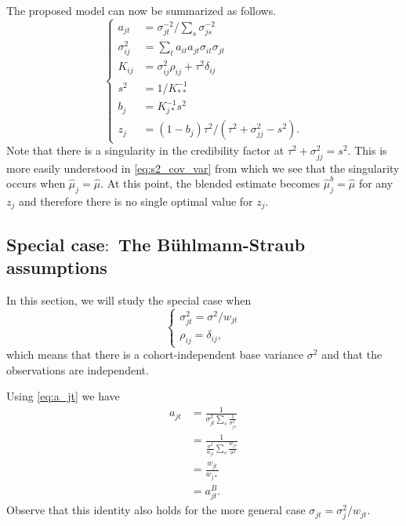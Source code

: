 \documentclass[11pt]{article}
\theoremstyle{definition}
\begin{document}
The proposed model can now be summarized as follows.
\begin{equation}\label{eq:proposed}
    \begin{cases}
    a_{jt} &= \sigma_{jt}^{-2}/\sum_s \sigma_{js}^{-2} \\
    \sigma_{ij}^2 &= \sum_t a_{it}a_{jt}\sigma_{it}\sigma_{jt} \\
     K_{ij} &= \sigma_{ij}^2\rho_{ij} + \tau^2\delta_{ij} \\
    s^2 &= 1/ K ^{-1}_{\ast\ast} \\
    b_j &=  K_{j\ast}^{-1}s^2 \\
    z_j &= (1-b_j)\tau^2/(\tau^2 + \sigma_{jj}^2 - s^2).
    \end{cases}
\end{equation}
Note that there is a singularity in the credibility factor at $\tau^2+\sigma_{jj}^2=s^2$. This is more easily understood in \eqref{eq:s2_cov_var} from which we see that the singularity occurs when $\hat\mu_j=\hat\mu$. At this point, the blended estimate becomes $\hat\mu_j^b=\hat\mu$ for any $z_j$ and therefore there is no single optimal value for $z_j$. 

\subsection{Special case$\colon$ The Bühlmann-Straub assumptions}
In this section, we will study the special case when
\begin{equation}\label{eq:special_case_1}
\begin{cases}
    \sigma_{jt}^2 = \sigma^2/w_{jt} \\
    \rho_{ij} = \delta_{ij},
\end{cases}
\end{equation}
which means that there is a cohort-independent base variance $\sigma^2$ and that the observations are independent.

Using \eqref{eq:a_jt} we have
\begin{equation}\label{eq:special_case_ajt}
\begin{aligned}
    a_{jt} &= \frac{1}{\sigma_{jt}^2\sum_s \frac{1}{\sigma_{js}^2}}\\
    &= \frac{1}{\frac{\sigma^2}{w_{jt}}\sum_s \frac{w_{js}}{\sigma^2}} \\
    &=  \frac{w_{jt}}{w_{j\ast}} \\
    &= a_{jt}^B.
\end{aligned}
\end{equation}
Observe that this identity also holds for the more general case $\sigma_{jt}=\sigma_j^2/w_{jt}$.
\end{document}
